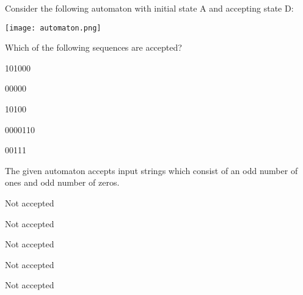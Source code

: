 

\begin{question}

Consider the following automaton with initial state A and accepting state D:

\texttt{[image: automaton.png]}

Which of the following sequences are accepted?

\begin{answerlist}
  \item 101000
  \item 00000
  \item 10100
  \item 0000110
  \item 00111
\end{answerlist}
\end{question}


\begin{solution}

The given automaton accepts input strings which consist of an
odd number of ones and
odd number of zeros.

\begin{answerlist}
  \item Not accepted
  \item Not accepted
  \item Not accepted
  \item Not accepted
  \item Not accepted
\end{answerlist}
\end{solution}


